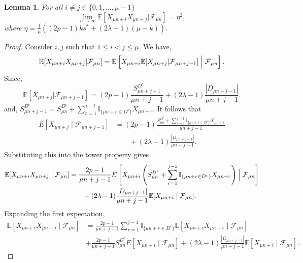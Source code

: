\documentclass{article}
\numberwithin{equation}{section}
\newtheorem{lemma}[theorem]{Lemma}
\newcommand{\FF}{\mbox{${\mathcal F}$}}
\newcommand{\I}{\mbox{${\mathbb I}$}}
\newcommand{\1}{\mathbf{1}}
\newcommand{\0}{\mathbf{0}}
\newcommand{\E}{\mbox{${\mathbb E}$}}
\begin{document}
\begin{lemma} \label{lem:crossterms}
For all $i \neq j \in \{0, 1, \dots, \mu-1 \}$
\[ \lim_{n \to \infty} \E\left[ X_{\mu n+i} X_{\mu n+j} \vert \FF_{\mu n} \right] = \eta^2, \]
where $\eta = \frac{1}{\mu}((2p-1){k}s^* +(2\lambda-1)(\mu-k))$. 
\end{lemma}
\begin{proof}
    Consider $i, j$ such that $1 \leq i < j \leq \mu$. We have,
    \[ \E[X_{\mu n+i}X_{\mu n+j}\vert \FF_{\mu n}] = \E \left[ X_{\mu n+i} \E[X_{\mu n+j}\vert  \FF_{\mu n + j-1} ] \Bigm| \FF_{\mu n} \right]. \]
    Since, \[\E[X_{\mu n+j}\vert \FF_{\mu n + j-1}] = (2p-1) \frac{S_{\mu n+j-1}^{D^c}}{\mu n+j-1} + (2\lambda-1) \frac{|D_{\mu n+j-1}|}{\mu n+j-1}.\]
    and, $S_{\mu n+j-1}^{D^c} = S_{\mu n}^{D^c} + \sum_{r=1}^{j-1} \I_{\{\mu n+r\in D^c\}} X_{\mu n+r}$. 
It follows that
\begin{align*}
E[X_{\mu n+j}\mid  \FF_{\mu n + j-1} ]
&=
(2p-1)
\frac{
S_{\mu n}^{D^c}
+
\sum_{r=1}^{j-1}
\I_{\{\mu n+r\in D^c\}}
X_{\mu n+r}
}
{\mu n+j-1}
\\
&\qquad
+
(2\lambda-1)
\frac{|D_{\mu n+j-1}|}{\mu n+j-1}.
\end{align*}
Substituting this into the tower property gives
\begin{align*}
\E[X_{\mu n+i}X_{\mu n+j}\mid \FF_{\mu n}]
&=
\frac{2p-1}{\mu n+j-1}
E\left[
X_{\mu n+i}
\left(
S_{\mu n}^{D^c}
+
\sum_{r=1}^{j-1}
\I_{\{\mu n+r\in D^c\}}
X_{\mu n+r}
\right)
\Bigm|
\FF_{\mu n}
\right]
\\
&\qquad
+
(2\lambda-1)
\frac{|D_{\mu n+j-1}|}{\mu n+j-1}
\E[X_{\mu n+i}\mid \FF_{\mu n}].
\end{align*}
Expanding the first expectation,
\begin{align*}
\E[X_{\mu n+i}X_{\mu n+j}\mid \FF_{\mu n}]
&= \frac{2p-1}{\mu n+j-1}
\sum_{r=1}^{j-1}
\I_{\{\mu n+r\in D^c\}}
\E[X_{\mu n+i}X_{\mu n+r}\mid \FF_{\mu n}]
\\
& + \frac{2p-1}{\mu n+j-1}
S_{\mu n}^{D^c}
E[X_{\mu n+i}\mid \FF_{\mu n}] +
(2\lambda-1)
\frac{|D_{\mu n+j-1}|}{\mu n+j-1}
\E[X_{\mu n+i}\mid \FF_{\mu n}].
\end{align*}


\end{proof}
\end{document}
